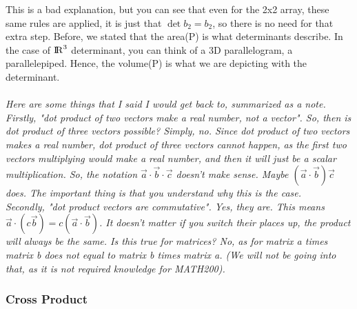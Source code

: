 \documentclass[addpoints]{exam}
\begin{document}
This is a bad explanation, but you can see that even for the 2x2 array, these same rules are applied, it is just that $\det b_2=b_2$, so there is no need for that extra step. Before, we stated that the area(P) is what determinants describe. In the case of ${\rm I\!R}^3$ determinant, you can think of a 3D parallelogram, a parallelepiped. Hence, the volume(P) is what we are depicting with the determinant.
\\\\
\textit{
Here are some things that I said I would get back to, summarized as a note.
Firstly, "dot product of two vectors make a real number, not a vector". So, then is dot product of three vectors possible? Simply, no. Since dot product of two vectors makes a real number, dot product of three vectors cannot happen, as the first two vectors multiplying would make a real number, and then it will just be a scalar multiplication. So, the notation $\vec{a}\cdot\vec{b}\cdot\vec{c}$ doesn't make sense. Maybe $(\vec{a}\cdot\vec{b})\vec{c}$ does. The important thing is that you understand why this is the case.\\
Secondly, "dot product vectors are commutative". Yes, they are. This means $\vec{a}\cdot(c\vec{b}) = c(\vec{a}\cdot\vec{b})$. It doesn't matter if you switch their places up, the product will always be the same. Is this true for matrices? No, as for matrix a times matrix b does not equal to matrix b times matrix a. (We will not be going into that, as it is not required knowledge for MATH200).
}

\subsubsection{
Cross Product
}
\end{document}
